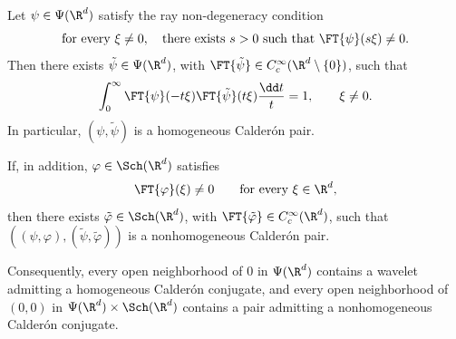 \begin{lemma} \label{lem:calderon-conjugate-construction} Let \(\psi\in\Psi(\R^d)\) satisfy the ray non-degeneracy condition
\[
\text{for every } \xi\neq0,\quad
\text{there exists } s>0 \text{ such that } \FT{\psi}(s\xi)\neq0.
\]
Then there exists \(\tilde{\psi}\in\Psi(\R^d)\), with \(\FT{\tilde{\psi}}\in C^\infty_c(\R^d\setminus\{0\})\), such that
\[
\int_0^\infty \FT{\psi}(-t\xi)\FT{\tilde{\psi}}(t\xi)\frac{\dd t}{t} = 1, \qquad \xi\neq0.
\]
In particular, \((\psi,\tilde{\psi})\) is a homogeneous Calder\'on pair.

If, in addition, \(\varphi\in\Sch(\R^d)\) satisfies
\[
\FT{\varphi}(\xi)\neq0 \qquad \text{for every } \xi\in\R^d,
\]
then there exists \(\tilde{\varphi}\in\Sch(\R^d)\), with \(\FT{\tilde{\varphi}}\in C^\infty_c(\R^d)\), such that \(((\psi,\varphi),(\tilde{\psi},\tilde{\varphi}))
\) is a nonhomogeneous Calder\'on pair.

Consequently, every open neighborhood of \(0\) in \(\Psi(\R^d)\) contains a wavelet admitting a homogeneous Calder\'on conjugate, and every open neighborhood of \((0,0)\) in \(\Psi(\R^d)\times\Sch(\R^d)\) contains a pair admitting a nonhomogeneous Calder\'on conjugate.
\end{lemma}

